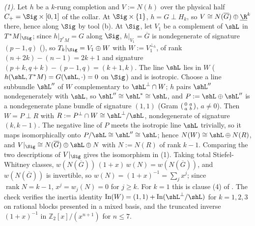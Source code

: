 \emph{(1).} Let $h$ be a $k$-rung completion and $V := N(h)$ over the physical half $C_+ = \Sig \times [0,1]$ of the collar. At $\Sig \times \{1\}$, $h = G \perp H_k$, so $V \cong N(\overline G) \oplus \underline{\R}^{k}$ there, hence along $\Sig$ by tool (b). At $\Sig$, let $V_1$ be a complement of $\shL$ in $T^*M|_\Sig$; since $h|_{T^*M} = G$ along $\Sig$, $h|_{V_1} = \overline G$ is nondegenerate of signature $(p{-}1, q)$ (), so $T_k|_\Sig = V_1 \oplus W$ with $W := V_1^{\perp_h}$, of rank $(n + 2k) - (n - 1) = 2k + 1$ and signature $(p{+}k, q{+}k) - (p{-}1, q) = (k{+}1, k)$. The line $\shL$ lies in $W$ ($h(\shL, T^*M) = G(\shL, \cdot) = 0$ on $\Sig$) and is isotropic. Choose a line subbundle $\shL''$ of $W$ complementary to $\shL^{\perp} \cap W$; $h$ pairs $\shL''$ nondegenerately with $\shL$, so $\shL'' \cong \shL^{*} \cong \shL$, and $P := \shL \oplus \shL''$ is a nondegenerate plane bundle of signature $(1,1)$ (Gram $\begin{psmallmatrix} 0 & a \\ a & b \end{psmallmatrix}$, $a \neq 0$). Then $W = P \perp R$ with $R := P^{\perp} \cap W \cong \shL^\perp/\shL$, nondegenerate of signature $(k, k{-}1)$. The negative line of $P$ meets the isotropic line $\shL$ trivially, so it maps isomorphically onto $P/\shL \cong \shL'' \cong \shL$; hence $N(W) \cong \shL \oplus N(R)$, and $V|_\Sig \cong N(\overline G) \oplus \shL \oplus N$ with $N := N(R)$ of rank $k - 1$. Comparing the two descriptions of $V|_\Sig$ gives the isomorphism in (1). Taking total Stiefel-Whitney classes, $w(N(\overline G))\,(1 + x)\,w(N) = w(N(\overline G))$, and $w(N(\overline G))$ is invertible, so $w(N) = (1+x)^{-1} = \sum_j x^{j}$; since $\operatorname{rank} N = k - 1$, $x^{j} = w_j(N) = 0$ for $j \geq k$. For $k = 1$ this is clause (4) of . The check verifies the inertia identity $\operatorname{In}(W) = (1,1) + \operatorname{In}(\shL^\perp/\shL)$ for $k = 1, 2, 3$ on rational blocks presented in a mixed basis, and the truncated inverse $(1+x)^{-1}$ in $\mathbb{Z}_2[x]/(x^{n+1})$ for $n \leq 7$.

